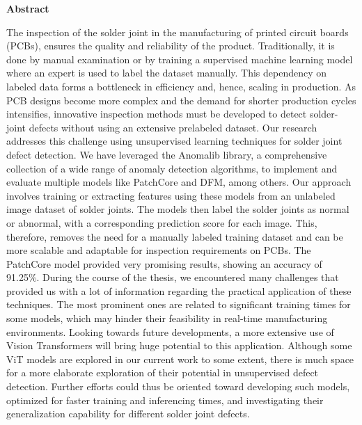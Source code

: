 
\begin{center}
\bfseries
{Abstract}
\normalfont
\end{center}
\sloppy
The inspection of the solder joint in the manufacturing of printed circuit boards (PCBs), ensures the quality and reliability of the product. Traditionally, it is done by manual examination or by training a supervised machine learning model where an expert is used to label the dataset manually. This dependency on labeled data forms a bottleneck in efficiency and, hence, scaling in production. As PCB designs become more complex and the demand for shorter production cycles intensifies, innovative inspection methods must be developed to detect solder-joint defects without using an extensive prelabeled dataset.
Our research addresses this challenge using unsupervised learning techniques for solder joint defect detection. We have leveraged the Anomalib library, a comprehensive collection of a wide range of anomaly detection algorithms, to implement and evaluate multiple models like PatchCore and DFM, among others. Our approach involves training or extracting features using these models from an unlabeled image dataset of solder joints. The models then label the solder joints as normal or abnormal, with a corresponding prediction score for each image. This, therefore, removes the need for a manually labeled training dataset and can be more scalable and adaptable for inspection requirements on PCBs. The PatchCore model provided very promising results, showing an accuracy of 91.25\%.
During the course of the thesis, we encountered many challenges that provided us with a lot of information regarding the practical application of these techniques. The most prominent ones are related to significant training times for some models, which may hinder their feasibility in real-time manufacturing environments. Looking towards future developments, a more extensive use of Vision Transformers will bring huge potential to this application. Although some ViT models are explored in our current work to some extent, there is much space for a more elaborate exploration of their potential in unsupervised defect detection. Further efforts could thus be oriented toward developing such models, optimized for faster training and inferencing times, and investigating their generalization capability for different solder joint defects.